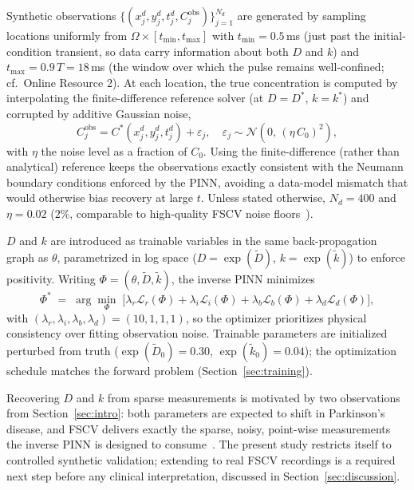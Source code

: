 \documentclass[12pt]{article}
\begin{document}
Synthetic observations
$\{(x_j^d, y_j^d, t_j^d, C_j^{\text{obs}})\}_{j=1}^{N_d}$ are
generated by sampling locations uniformly from
$\Omega \times [t_{\min}, t_{\max}]$ with $t_{\min} = 0.5\,$ms
(just past the initial-condition transient, so data carry
information about both $D$ and $k$) and
$t_{\max} = 0.9\,T = 18\,$ms (the window over which the pulse
remains well-confined; cf.\ Online Resource 2). At each
location, the true concentration is computed by interpolating
the finite-difference reference solver (at $D=D^*$, $k=k^*$)
and corrupted by additive Gaussian noise,
\begin{equation}
  C_j^{\text{obs}} = C^*(x_j^d, y_j^d, t_j^d) + \varepsilon_j,
  \quad \varepsilon_j \sim \mathcal{N}\!\left(0,\,(\eta\, C_0)^2\right),
  \label{eq:observation}
\end{equation}
with $\eta$ the noise level as a fraction of $C_0$. Using the
finite-difference (rather than analytical) reference keeps the
observations exactly consistent with the Neumann boundary
conditions enforced by the PINN, avoiding a data-model mismatch
that would otherwise bias recovery at large $t$. Unless stated
otherwise, $N_d = 400$ and $\eta = 0.02$ ($2\%$, comparable to
high-quality FSCV noise floors~\cite{Rodeberg2017}).

$D$ and $k$ are introduced as trainable variables in the same
back-propagation graph as $\theta$, parametrized in log space
($D = \exp(\tilde{D})$, $k = \exp(\tilde{k})$) to enforce
positivity. Writing $\Phi = (\theta, \tilde{D}, \tilde{k})$, the
inverse PINN minimizes
\begin{equation}
  \Phi^* \;=\; \arg\min_{\Phi}\;
    \big[\lambda_r \mathcal{L}_r(\Phi)
       + \lambda_i \mathcal{L}_i(\Phi)
       + \lambda_b \mathcal{L}_b(\Phi)
       + \lambda_d \mathcal{L}_d(\Phi)\big],
  \label{eq:inverse_loss}
\end{equation}
with $(\lambda_r, \lambda_i, \lambda_b, \lambda_d) = (10,1,1,1)$,
so the optimizer prioritizes physical consistency over fitting
observation noise. Trainable parameters are initialized
perturbed from truth ($\exp(\tilde{D}_0) = 0.30$,
$\exp(\tilde{k}_0) = 0.04$); the optimization schedule matches
the forward problem (Section~\ref{sec:training}).

Recovering $D$ and $k$ from sparse measurements is motivated by
two observations from Section~\ref{sec:intro}: both parameters
are expected to shift in Parkinson's disease, and FSCV delivers
exactly the sparse, noisy, point-wise measurements the inverse
PINN is designed to consume~\cite{Rodeberg2017}. The present
study restricts itself to controlled synthetic validation;
extending to real FSCV recordings is a required next step before
any clinical interpretation, discussed in
Section~\ref{sec:discussion}.
\end{document}
